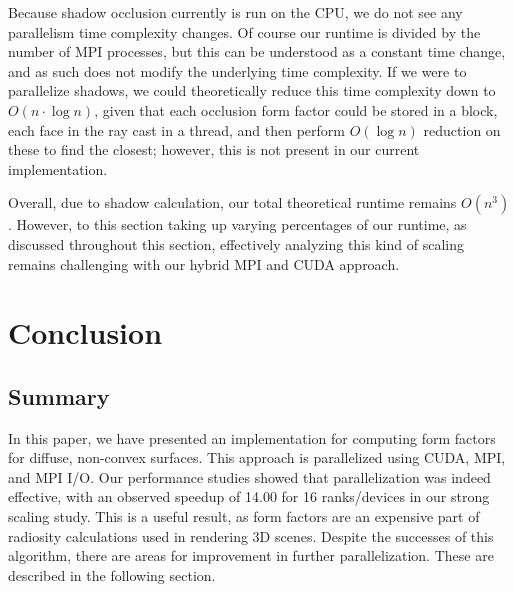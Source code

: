 \documentclass[conference]{IEEEtran}
\begin{document}
Because shadow occlusion currently is run on the CPU, we do not see any parallelism time complexity changes. Of course our runtime is divided by the number of MPI processes, but this can be understood as a constant time change, and as such does not modify the underlying time complexity. If we were to parallelize shadows, we could theoretically reduce this time complexity down to $O(n\cdot \log n)$, given that each occlusion form factor could be stored in a block, each face in the ray cast in a thread, and then perform $O(\log n)$ reduction on these to find the closest; however, this is not present in our current implementation.

Overall, due to shadow calculation, our total theoretical runtime remains $O(n^3)$. However, to this section taking up varying percentages of our runtime, as discussed throughout this section, effectively analyzing this kind of scaling remains challenging with our hybrid MPI and CUDA approach.

\section{Conclusion}
\subsection{Summary}
In this paper, we have presented an implementation for computing form factors for diffuse, non-convex surfaces. This approach is parallelized using CUDA, MPI, and MPI I/O. Our performance studies showed that parallelization was indeed effective, with an observed speedup of 14.00 for 16 ranks/devices in our strong scaling study. This is a useful result, as form factors are an expensive part of radiosity calculations used in rendering 3D scenes. Despite the successes of this algorithm, there are areas for improvement in further parallelization. These are described in the following section.  
\end{document}
